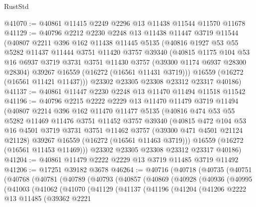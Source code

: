 \begin{lexlean}{RustStd}
\begin{coremodule}
@41070 := @40861 @11415 @2249 @2296 @13 @11438 @11544 @11570 @11678
@41129 := @40796
    @2212
    @2230
    @2248
    @13
    @11438
    @11447
    @3719
    @11544
    (@40807
      @2211
      @396
      @162
      @11438
      @11445
      @5135
      (@40816
        @1927
        @53
        @55
        @5282
        @11437
        @11444
        @3751
        @11420
        @3757
        @39340
        (@40815
          @1175
          @104
          @53
          @16
          @6937
          @3719
          @3731
          @3751
          @11430
          @3757
          (@39300 @1174 @6937 @28300 @28304)
          @39267
          @16559
          (@16272 (@16561 @11431 @3719)))
        @16559
        (@16272 (@16561 @11421 @11437)))
      @23302
      @23305
      @23308
      @23312
      @23317
      @40186)
@41137 := @40861 @11447 @2230 @2248 @13 @11470 @11494 @11518 @11542
@41196 := @40796
    @2215
    @2222
    @2229
    @13
    @11470
    @11479
    @3719
    @11494
    (@40807
      @2214
      @396
      @162
      @11470
      @11477
      @5135
      (@40816
        @474
        @53
        @55
        @5282
        @11469
        @11476
        @3751
        @11452
        @3757
        @39340
        (@40815
          @472
          @104
          @53
          @16
          @4501
          @3719
          @3731
          @3751
          @11462
          @3757
          (@39300 @471 @4501 @21124 @21128)
          @39267
          @16559
          (@16272 (@16561 @11463 @3719)))
        @16559
        (@16272 (@16561 @11453 @11469)))
      @23302
      @23305
      @23308
      @23312
      @23317
      @40186)
@41204 := @40861 @11479 @2222 @2229 @13 @3719 @11485 @3719 @11492
@41206 := @17251 @39182 @3678
@46264 := @40716
    (@40718
      (@40735
        (@40751
          (@40768
            (@40781
              (@40789
                (@40793
                  (@40857
                    (@40869
                      (@40928
                        (@40936
                          (@40995
                            (@41003
                              (@41062
                                (@41070
                                  (@41129
                                    (@41137
                                      (@41196
                                        (@41204
                                          (@41206
                                            @2222
                                            @13
                                            @11485
                                            (@39362
                                              @2221

\end{coremodule}
\end{lexlean}
